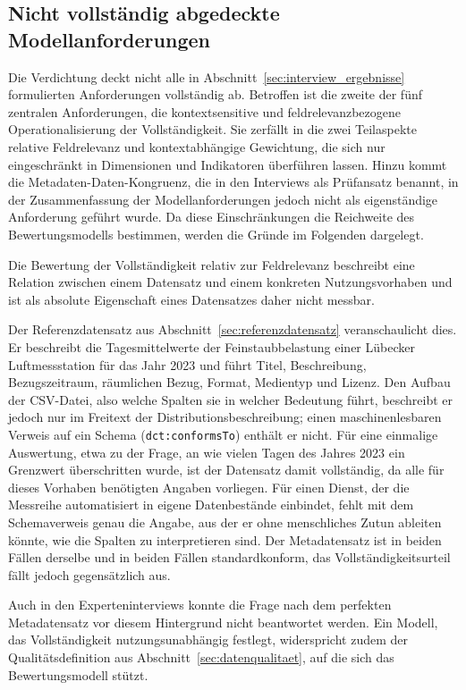 \subsection{Nicht vollständig abgedeckte Modellanforderungen}
\label{subsec:reichweite_dimensionen}

Die Verdichtung deckt nicht alle in Abschnitt~\ref{sec:interview_ergebnisse} formulierten Anforderungen vollständig ab. Betroffen ist die zweite der fünf zentralen Anforderungen, die kontextsensitive und feldrelevanzbezogene Operationalisierung der Vollständigkeit. Sie zerfällt in die zwei Teilaspekte relative Feldrelevanz und kontextabhängige Gewichtung, die sich nur eingeschränkt in Dimensionen und Indikatoren überführen lassen. Hinzu kommt die Metadaten-Daten-Kongruenz, die in den Interviews als Prüfansatz benannt, in der Zusammenfassung der Modellanforderungen jedoch nicht als eigenständige Anforderung geführt wurde. Da diese Einschränkungen die Reichweite des Bewertungsmodells bestimmen, werden die Gründe im Folgenden dargelegt.

Die Bewertung der Vollständigkeit relativ zur Feldrelevanz beschreibt eine Relation zwischen einem Datensatz und einem konkreten Nutzungsvorhaben und ist als absolute Eigenschaft eines Datensatzes daher nicht messbar.

Der Referenzdatensatz aus Abschnitt~\ref{sec:referenzdatensatz} veranschaulicht dies. Er beschreibt die Tagesmittelwerte der Feinstaubbelastung einer Lübecker Luftmessstation für das Jahr 2023 und führt Titel, Beschreibung, Bezugszeitraum, räumlichen Bezug, Format, Medientyp und Lizenz. Den Aufbau der CSV-Datei, also welche Spalten sie in welcher Bedeutung führt, beschreibt er jedoch nur im Freitext der Distributionsbeschreibung; einen maschinenlesbaren Verweis auf ein Schema (\texttt{dct:conformsTo}) enthält er nicht. Für eine einmalige Auswertung, etwa zu der Frage, an wie vielen Tagen des Jahres 2023 ein Grenzwert überschritten wurde, ist der Datensatz damit vollständig, da alle für dieses Vorhaben benötigten Angaben vorliegen. Für einen Dienst, der die Messreihe automatisiert in eigene Datenbestände einbindet, fehlt mit dem Schemaverweis genau die Angabe, aus der er ohne menschliches Zutun ableiten könnte, wie die Spalten zu interpretieren sind. Der Metadatensatz ist in beiden Fällen derselbe und in beiden Fällen standardkonform, das Vollständigkeitsurteil fällt jedoch gegensätzlich aus.

Auch in den Experteninterviews konnte die Frage nach dem perfekten Metadatensatz vor diesem Hintergrund nicht beantwortet werden. Ein Modell, das Vollständigkeit nutzungsunabhängig festlegt, widerspricht zudem der Qualitätsdefinition aus Abschnitt~\ref{sec:datenqualitaet}, auf die sich das Bewertungsmodell stützt.

